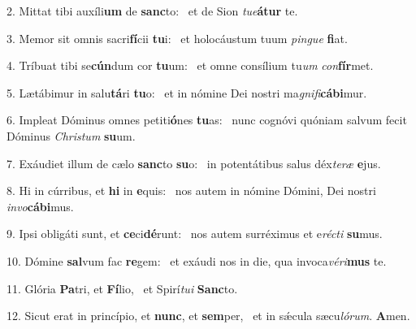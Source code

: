 2. Mittat tibi auxíli\textbf{um} de \textbf{sanc}to: \ast\  et de Sion \textit{tu}\textit{e}\textbf{á}\textbf{tur} te.\

3. Memor sit omnis sacri\textbf{fí}cii \textbf{tu}i: \ast\  et holocáustum tuum \textit{pin}\textit{gue} \textbf{fi}at.\

4. Tríbuat tibi se\textbf{cún}dum cor \textbf{tu}um: \ast\  et omne consílium tu\textit{um} \textit{con}\textbf{fír}met.\

5. Lætábimur in salu\textbf{tá}ri \textbf{tu}o: \ast\  et in nómine Dei nostri ma\textit{gni}\textit{fi}\textbf{cá}\textbf{bi}mur.\

6. Impleat Dóminus omnes petiti\textbf{ó}nes \textbf{tu}as: \ast\  nunc cognóvi quóniam salvum fecit Dóminus \textit{Chris}\textit{tum} \textbf{su}um.\

7. Exáudiet illum de cælo \textbf{sanc}to \textbf{su}o: \ast\  in potentátibus salus déx\textit{te}\textit{ræ} \textbf{e}jus.\

8. Hi in cúrribus, et \textbf{hi} in \textbf{e}quis: \ast\  nos autem in nómine Dómini, Dei nostri \textit{in}\textit{vo}\textbf{cá}\textbf{bi}mus.\

9. Ipsi obligáti sunt, et \textbf{ce}ci\textbf{dé}runt: \ast\  nos autem surréximus et e\textit{réc}\textit{ti} \textbf{su}mus.\

10. Dómine \textbf{sal}vum fac \textbf{re}gem: \ast\  et exáudi nos in die, qua invoca\textit{vé}\textit{ri}\textbf{mus} te.\

11. Glória \textbf{Pa}tri, et \textbf{Fí}lio, \ast\  et Spirí\textit{tu}\textit{i} \textbf{Sanc}to.\

12. Sicut erat in princípio, et \textbf{nunc}, et \textbf{sem}per, \ast\  et in sǽcula sæcu\textit{ló}\textit{rum}. \textbf{A}men.\

